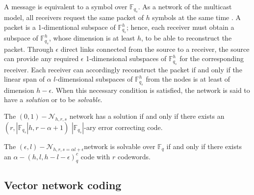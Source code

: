 A message is equivalent to a symbol over $\ensuremath{\mathbb{F}}_{q_{s}}$.
As a network of the multicast model, all receivers request the same
packet of $h$ symbols at the same time \cite{Trautmann:2013}. A
packet is a 1-dimentional subspace of $\ensuremath{\mathbb{F}}_{q_{s}}^{h}$;
hence, each receiver must obtain a subspace of $\ensuremath{\mathbb{F}}_{q_{s}}^{h}$,
whose dimension is at least $h$, to be able to reconstruct the packet.
Through $\epsilon$ direct links connected from the source to a receiver,
the source can provide any required $\epsilon$ 1-dimensional subspaces
of $\ensuremath{\mathbb{F}}_{q_{s}}^{h}$ for the corresponding receiver.
Each receiver can accordingly reconstruct the packet if and only if
the linear span of $\alpha$ $l$-dimensional subspaces of $\ensuremath{\mathbb{F}}_{q_{s}}^{h}$
from the nodes is at least of dimension $h-\epsilon$. When this necessary
condition is satisfied, the network is said to have a \textit{solution}
or to be \textit{solvable}.
\begin{thm}
The $(0,1)-\mathcal{N}_{h,r,s}$ network has a solution if and only
if there exists an $\left(r,\left|\ensuremath{\mathbb{F}}_{q_{s}}\right|h,r-\alpha+1\right)$
$\left|\ensuremath{\mathbb{F}}_{q_{s}}\right|$-ary error correcting
code. \cite{Riis:2006}
\end{thm}
%
\begin{thm}
The $(\epsilon,l)-\mathcal{N}_{h,r,s=\alpha l+\epsilon}$network is
solvable over $\ensuremath{\mathbb{F}}_{q}$ if and only if there
exists an $\alpha-\left(h,l,h-l-\epsilon\right)_{q}^{c}$ code with
$r$ codewords. \cite{Zhang:2019} \label{theo:scalar_sol_exist}
\end{thm}

\subsection{Vector network coding}

